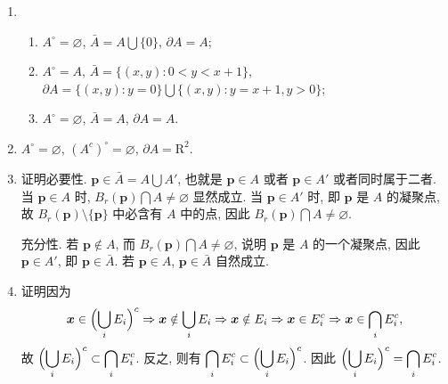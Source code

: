 \documentclass[a4paper, 11pt]{ctexart}
\begin{document}
\begin{enumerate}
    \item %
        \begin{enumerate}[(1)]
            \item $A^\circ = \varnothing$, $\bar A = A \bigcup \{0\}$, $\partial A = A$;
            \item $A^\circ = A$, $\bar A = \{(x, y) : 0 < y < x + 1\}$, $\partial A = \{(x, y) : y = 0\} \bigcup \{(x, y) : y = x + 1, y > 0\}$;
            \item $A^\circ = \varnothing$, $\bar A = A$, $\partial A = A$.
        \end{enumerate}
    \item %
        $A^\circ = \varnothing$, $(A^c)^\circ = \varnothing$, $\partial A = \mathrm{R}^2$.
    \item %
        {\heiti 证明}\quad 必要性. $\boldsymbol{p} \in \bar A = A \bigcup A'$, 也就是 $\boldsymbol{p} \in A$ 或者 $\boldsymbol{p} \in A'$ 或者同时属于二者.
        当 $\boldsymbol{p} \in A$ 时, $B_r(\boldsymbol{p}) \bigcap A \neq \varnothing$ 显然成立. 当 $\boldsymbol{p} \in A'$ 时, 即 $\boldsymbol{p}$ 是 $A$ 的凝聚点,
        故 $B_r(\boldsymbol{p}) \setminus \{\boldsymbol{p}\}$ 中必含有 $A$ 中的点, 因此 $B_r(\boldsymbol{p}) \bigcap A \neq \varnothing$.

        充分性. 若 $\boldsymbol{p} \notin A$, 而 $B_r(\boldsymbol{p}) \bigcap A \neq \varnothing$, 说明 $\boldsymbol{p}$ 是 $A$ 的一个凝聚点, 因此 $\boldsymbol{p} \in A'$, 即 $\boldsymbol{p} \in \bar{A}$.
        若 $\boldsymbol{p} \in A$, $\boldsymbol{p} \in \bar A$ 自然成立. 
    \item %
        {\heiti 证明}\quad 因为
        \[
            \boldsymbol{x} \in \Bigl(\bigcup_i E_i\Bigr)^c \Rightarrow \boldsymbol{x} \notin \bigcup_i E_i
            \Rightarrow \boldsymbol{x} \notin E_i \Rightarrow \boldsymbol{x} \in E_i^c
            \Rightarrow \boldsymbol{x} \in \bigcap_i E_i^c,    
        \]
        故 $\displaystyle{\Bigl(\bigcup_i E_i\Bigr)^c \subset \bigcap_i E_i^c}$. 反之, 则有 $\displaystyle{\bigcap_i E_i^c \subset \Bigl(\bigcup_i E_i\Bigr)^c}$.
        因此 $\displaystyle{\Bigl(\bigcup_i E_i\Bigr)^c = \bigcap_i E_i^c}$.
        

\end{enumerate}
\end{document}
